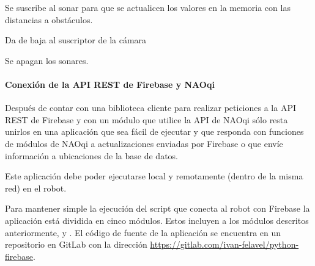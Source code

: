 
\begin{fulllineitems}
\label{\detokenize{nao_firebase:nao_robot.Robot.subscribe_to_sonar}}
Se suscribe al sonar para que se actualicen los valores en la memoria
con las distancias a obstáculos.

\end{fulllineitems}


\begin{fulllineitems}
\label{\detokenize{nao_firebase:nao_robot.Robot.unsubscribe_to_camera}}
Da de baja al suscriptor de la cámara

\end{fulllineitems}


\begin{fulllineitems}
\label{\detokenize{nao_firebase:nao_robot.Robot.unsubscribe_to_sonar}}
Se apagan los sonares.

\end{fulllineitems}




\paragraph{Conexión de la API REST de Firebase y NAOqi}
\label{\detokenize{nao_firebase:conectando-la-api-rest-de-firebase-y-naoqi}}
Después de contar con una biblioteca cliente para realizar peticiones a la
API REST de Firebase y con un módulo que utilice la API de NAOqi sólo
resta unirlos en una aplicación que sea fácil de ejecutar y que responda con
funciones de módulos de NAOqi a actualizaciones enviadas por Firebase o
que envíe información a ubicaciones de la base de datos.

Este aplicación debe poder ejecutarse local y remotamente (dentro de la misma red)
en el robot.

Para mantener simple la ejecución del script que conecta al robot con Firebase
la aplicación está dividida en cinco módulos. Estos incluyen a los módulos
descritos anteriormente,  y . El código de fuente de la aplicación 
se encuentra en un repositorio
en GitLab con la dirección
\url{https://gitlab.com/ivan-felavel/python-firebase}.


